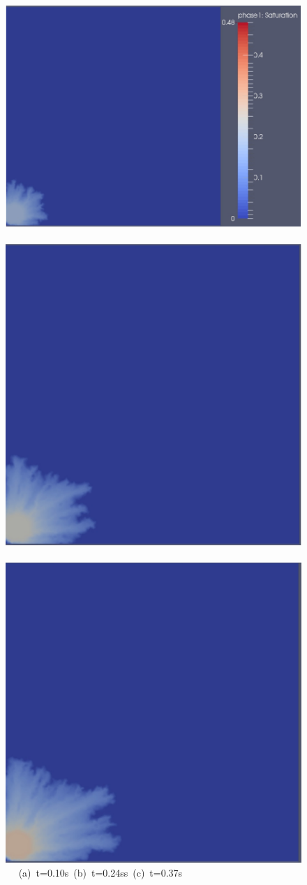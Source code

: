 \begin{landscape}
  \begin{figure}[ht]
  \vbox{\vspace{-.5cm}
      \hbox{\includegraphics[width=.65\textwidth, height=.46\textwidth]{./Pics1/Saffman_heterogeneous_VR150/ST_Heterog_VR150_D200Hb.pdf} 
            \includegraphics[width=.45\textwidth]{./Pics1/Saffman_heterogeneous_VR150/ST_Heterog_VR150_D500Hb.pdf}
            \includegraphics[width=.45\textwidth]{./Pics1/Saffman_heterogeneous_VR150/ST_Heterog_VR150_D800Hb.pdf} }
      \hbox{\hspace{2.0cm} (a) t=0.10s \hspace{6.cm} (b) t=0.24ss \hspace{4.cm} (c) t=0.37s}
      \vspace{0.5cm}
}
\end{figure}
\end{landscape}
